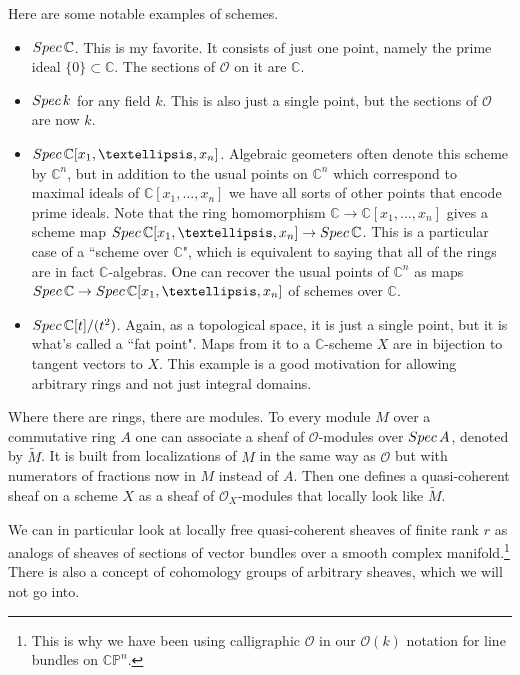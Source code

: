 \documentclass[11pt]{article}
\numberwithin{equation}{section}
\numberwithin{footnote}{section}
\renewcommand{\P}{{\mathbb P}}
\newcommand{\C}{{\mathbb C}}
\begin{document}
\smallskip
Here are some notable examples of schemes.
\begin{itemize}
\item ${\rm Spec}\,\C$. This is my favorite. It consists of just one point, namely the prime ideal $\{0\}\subset \C$. The 
sections of $\mathcal O$ on it are $\C$.

\item ${\rm Spec}\,k$ for any field $k$. This is also just a single point, but the sections of $\mathcal O$ are now $k$.

\item ${\rm Spec}\,\C[x_1,\ldots, x_n]$. Algebraic geometers often denote this scheme by $\C^n$, but in addition to the usual points on $\C^n$ which correspond to maximal ideals of $\C[x_1,\ldots, x_n]$ we have all sorts of other points that encode prime ideals.
Note that the ring homomorphism $\C\to \C[x_1,\ldots, x_n]$ gives a scheme map  ${\rm Spec}\,\C[x_1,\ldots, x_n]\to
{\rm Spec}\,\C$. This is a particular case of a ``scheme over $\C$", which is equivalent to saying that all of the rings are in fact 
$\C$-algebras. One can recover the usual points of $\C^n$ as maps ${\rm Spec}\,\C\to {\rm Spec}\,\C[x_1,\ldots, x_n]$ 
of schemes over $\C$.

\item ${\rm Spec}\,\C[t]/(t^2)$. Again, as a topological space, it is just a single point, but it is what's called a ``fat point". Maps 
from it to a $\C$-scheme $X$ are in bijection to tangent vectors to $X$. This example is a good motivation for allowing arbitrary rings and not just integral domains. 
\end{itemize}

\smallskip
Where there are rings, there are modules. To every module $M$ over a commutative ring $A$ one can associate a sheaf of $\mathcal O$-modules over ${\rm Spec}\,A$, denoted by $\tilde M$. It is built from localizations of $M$ in the same way as $\mathcal O$ but
with numerators of fractions now in $M$ instead of $A$.
Then one defines a quasi-coherent sheaf on a scheme $X$ as a sheaf of $\mathcal O_X$-modules that locally look like $\tilde M$.

\smallskip
We can in particular look at locally free quasi-coherent sheaves of finite rank $r$ as analogs of sheaves of sections of vector bundles over a smooth complex manifold.\footnote{ This is why we have been using calligraphic $\mathcal O$ in our $\mathcal O(k)$ notation for line bundles on $\C\P^n$.} There is also a concept of cohomology groups of arbitrary sheaves, which we will not go into. 
\end{document}
